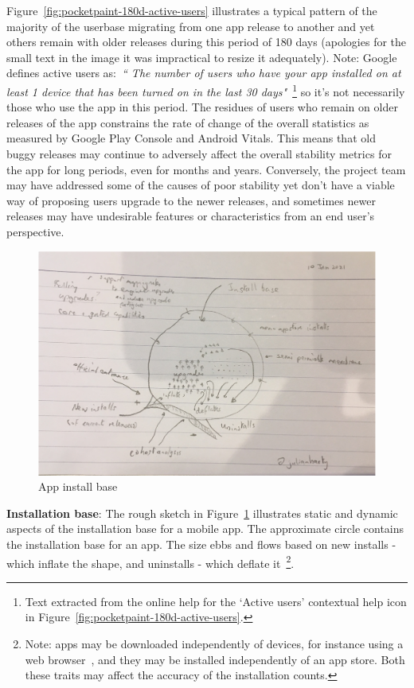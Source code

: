Figure~\ref{fig:pocketpaint-180d-active-users} illustrates a typical pattern of the majority of the userbase migrating from one app release to another and yet others remain with older releases during this period of 180 days (apologies for the small text in the image it was impractical to resize it adequately). Note: Google defines active users as:~\emph{``
The number of users who have your app installed on at least 1 device that has been turned on in the last 30 days"}~\footnote{Text extracted from the online help for the `Active users' contextual help icon in Figure~\ref{fig:pocketpaint-180d-active-users}.} so it's not necessarily those who use the app in this period. The residues of users who remain on older releases of the app constrains the rate of change of the overall statistics as measured by Google Play Console and Android Vitals. This means that old buggy releases may continue to adversely affect the overall stability metrics for the app for long periods, even for months and years. Conversely, the project team may have addressed some of the causes of poor stability yet don't have a viable way of proposing users upgrade to the newer releases, and sometimes newer releases may have undesirable features or characteristics from an end user's perspective.

\begin{figure}
    \centering
    \includegraphics[width=14cm]{images/rough-sketches/app-install-base.png}
    \caption{App install base}
    \label{fig:app-install-base-rough}
\end{figure}

\textbf{Installation base}: The rough sketch in Figure~\ref{fig:app-install-base-rough} illustrates static and dynamic aspects of the installation base for a mobile app. The approximate circle contains the installation base for an app. The size ebbs and flows based on new installs - which inflate the shape, and uninstalls - which deflate it~\footnote{Note: apps may be downloaded independently of devices, for instance using a web browser~\citep{norwied2012_download_android_install_files}, and they may be installed independently of an app store. Both these traits may affect the accuracy of the installation counts.}. 

